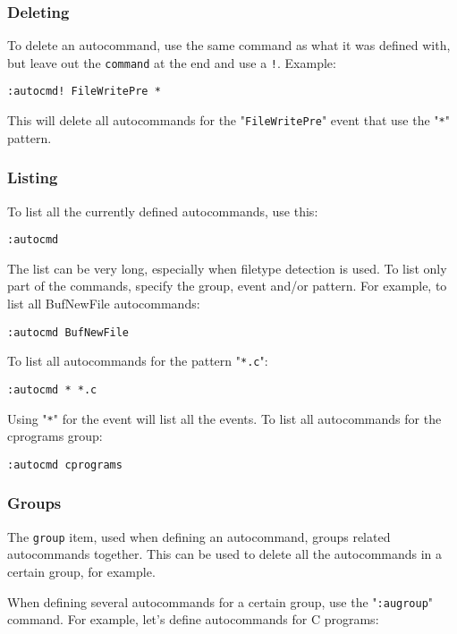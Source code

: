 {{\subsubsection{Deleting}
To delete an autocommand, use the same command as what it was defined with, but leave out the \texttt{{command}} at the end and use a \texttt{!}.
Example:

\begin{Verbatim}[samepage=true]
 :autocmd! FileWritePre *
\end{Verbatim}

This will delete all autocommands for the "\texttt{FileWritePre}" event that use the "\texttt{*}" pattern.
\subsubsection{Listing}
To list all the currently defined autocommands, use this:

\begin{Verbatim}[samepage=true]
 :autocmd
\end{Verbatim}

The list can be very long, especially when filetype detection is used.
To list only part of the commands, specify the group, event and/or pattern.
For example, to list all BufNewFile autocommands:

\begin{Verbatim}[samepage=true]
 :autocmd BufNewFile
\end{Verbatim}

To list all autocommands for the pattern "\texttt{*.c}":

\begin{Verbatim}[samepage=true]
 :autocmd * *.c
\end{Verbatim}

Using "\texttt{*}" for the event will list all the events.
To list all autocommands for the cprograms group:

\begin{Verbatim}[samepage=true]
 :autocmd cprograms
\end{Verbatim}

\subsubsection{Groups}
The \texttt{{group}} item, used when defining an autocommand, groups related autocommands together.
This can be used to delete all the autocommands in a certain group, for example.

When defining several autocommands for a certain group, use the "\texttt{:augroup}" command.
For example, let's define autocommands for C programs:

}}
